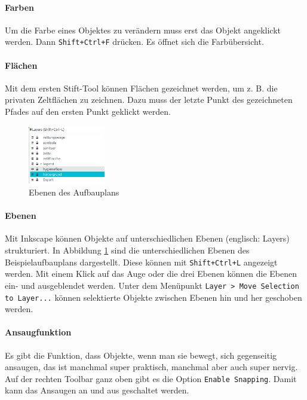 \documentclass[letterpaper,12pt,
				parkskip = half]{article}
\begin{document}
\paragraph{Farben}
Um die Farbe eines Objektes zu verändern muss erst das Objekt angeklickt werden. Dann \texttt{Shift+Ctrl+F} drücken. Es öffnet sich die Farbübersicht.



\paragraph{Flächen}
Mit dem ersten Stift-Tool können Flächen gezeichnet werden, um z. B. die privaten Zeltflächen zu zeichnen. Dazu muss der letzte Punkt des gezeichneten Pfades auf den ersten Punkt geklickt werden.
\clearpage
\begin{figure}
	\includegraphics[width=0.3\textwidth]{Images/layers.png}
	\caption{Ebenen des Aufbauplans}
	\label{fig:layers}
\end{figure}


\paragraph{Ebenen}

Mit Inkscape können Objekte auf unterschiedlichen Ebenen (englisch: Layers) strukturiert. In Abbildung \ref{fig:layers} sind die unterschiedlichen Ebenen des Beispielaufbauplans dargestellt. Diese können mit \texttt{Shift+Ctrl+L} angezeigt werden. Mit einem Klick auf das Auge oder die drei Ebenen können die Ebenen ein- und ausgeblendet werden. Unter dem Menüpunkt \texttt{Layer > Move Selection to Layer...} können selektierte Objekte zwischen Ebenen hin und her geschoben werden. 


\paragraph{Ansaugfunktion}

Es gibt die Funktion, dass Objekte, wenn man sie bewegt, sich gegenseitig ansaugen, das ist manchmal super praktisch, manchmal aber auch super nervig.
Auf der rechten Toolbar ganz oben gibt es die Option \texttt{Enable Snapping}. Damit kann das Ansaugen an und aus geschaltet werden.
\end{document}
